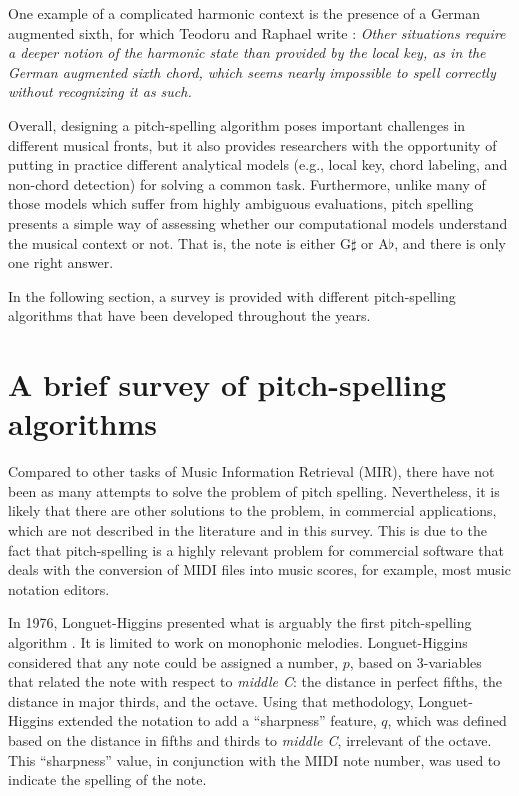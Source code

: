 One example of a complicated harmonic context is the presence of a German augmented sixth, for which Teodoru and Raphael write \cite{teodoru_pitch_2007}: \emph{Other situations require a deeper notion of the harmonic state than provided by the local key, as in the German augmented sixth chord, which seems nearly impossible to spell correctly without recognizing it as such.}

Overall, designing a pitch-spelling algorithm poses important challenges in different musical fronts, but it also provides researchers with the opportunity of putting in practice different analytical models (e.g., local key, chord labeling, and non-chord detection) for solving a common task. Furthermore, unlike many of those models which suffer from highly ambiguous evaluations, pitch spelling presents a simple way of assessing whether our computational models understand the musical context or not. That is, the note is either G$\sharp$ or A$\flat$, and there is only one right answer.

In the following section, a survey is provided with different pitch-spelling algorithms that have been developed throughout the years.

\section{A brief survey of pitch-spelling algorithms}

Compared to other tasks of Music Information Retrieval (MIR), there have not been as many attempts to solve the problem of pitch spelling. Nevertheless, it is likely that there are other solutions to the problem, in commercial applications, which are not described in the literature and in this survey. This is due to the fact that pitch-spelling is a highly relevant problem for commercial software that deals with the conversion of MIDI files into music scores, for example, most music notation editors.

In 1976, Longuet-Higgins presented what is arguably the first pitch-spelling algorithm \cite{longuet-higgins_perception_1976}. It is limited to work on monophonic melodies. Longuet-Higgins considered that any note could be assigned a number, $p$, based on 3-variables that related the note with respect to \emph{middle C}: the distance in perfect fifths, the distance in major thirds, and the octave. Using that methodology, Longuet-Higgins extended the notation to add a ``sharpness'' feature, $q$, which was defined based on the distance in fifths and thirds to \emph{middle C}, irrelevant of the octave. This ``sharpness'' value, in conjunction with the MIDI note number, was used to indicate the spelling of the note.

